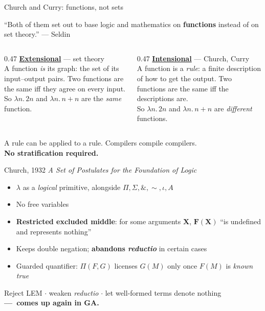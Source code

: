 \documentclass[aspectratio=169,11pt]{beamer}
\newcommand{\key}[1]{{\color{accent}\textbf{#1}}}
\begin{document}
\begin{frame}{Church and Curry: functions, not sets}
  \begin{center}\small
    ``Both of them set out to base logic and mathematics on \textbf{functions}
    instead of on set theory.'' \hfill{\footnotesize --- Seldin}
  \end{center}
  \vfill
  \begin{columns}[T]
    \begin{column}{0.47\textwidth}
      \underline{\key{Extensional}} --- set theory\\[0.6em]
      {\small A function \emph{is} its graph: the set of its
       input--output pairs. Two functions are the same iff they agree
       on every input.}\\[0.8em]
      {\small So $\lambda n.\,2n$ and $\lambda n.\,n+n$ are the
       \emph{same} function.}
    \end{column}
    \begin{column}{0.47\textwidth}
      \underline{\key{Intensional}} --- Church, Curry\\[0.6em]
      {\small A function is a \emph{rule}: a finite description of how to get
       the output. Two functions are the same iff the descriptions are.}\\[0.8em]
      {\small So $\lambda n.\,2n$ and $\lambda n.\,n+n$ are
       \emph{different} functions.}
    \end{column}
  \end{columns}
  \vfill
  \pause
  \begin{center}
    A rule can be applied to a rule. Compilers compile compilers.\\
    \key{No stratification required.}
  \end{center}
\end{frame}

\begin{frame}{Church, 1932}
  \textit{A Set of Postulates for the Foundation of Logic}
  \vfill
  \begin{itemize}\itemsep0.8em
    \item $\lambda$ as a \emph{logical} primitive, alongside $\Pi, \Sigma, \&, \sim, \iota, A$
    \item No free variables
    \item \key{Restricted excluded middle}: for some arguments $\mathbf{X}$,
          $\mathbf{F(X)}$ ``is undefined and represents nothing''
    \item Keeps double negation; \key{abandons \emph{reductio}} in certain cases
    \item Guarded quantifier: $\Pi(F,G)$ licenses $G(M)$ only once $F(M)$ is \emph{known true}
  \end{itemize}
  \vfill
  \pause
  \begin{center}\small
    Reject LEM $\cdot$ weaken \emph{reductio} $\cdot$ let well-formed terms denote nothing\\
    \key{---\ comes up again in GA.}
  \end{center}
\end{frame}
\end{document}
